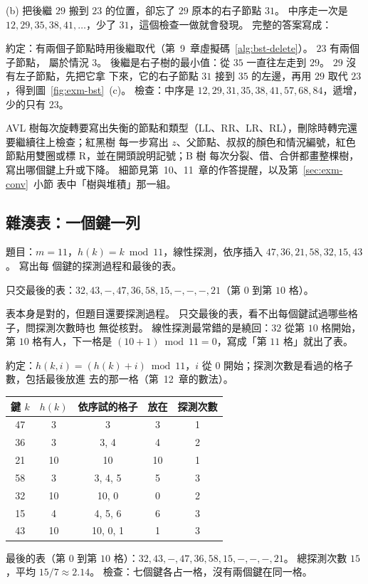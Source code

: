 (b) 把後繼 $29$ 搬到 $23$ 的位置，卻忘了 $29$ 原本的右子節點 $31$。 中序走一次是
$12, 29, 35, 38, 41, \ldots$，少了 $31$，這個檢查一做就會發現。 完整的答案寫成：

\begin{exmgood}
約定：有兩個子節點時用後繼取代（第~9~章虛擬碼~\ref{alg:bst-delete}）。 $23$ 有兩個子節點，
屬於情況 3。 後繼是右子樹的最小值：從 $35$ 一直往左走到 $29$。 $29$ 沒有左子節點，先把它拿
下來，它的右子節點 $31$ 接到 $35$ 的左邊，再用 $29$ 取代 $23$，得到圖~\ref{fig:exm-bst}~(c)。
檢查：中序是 $12, 29, 31, 35, 38, 41, 57, 68, 84$，遞增，少的只有 $23$。
\end{exmgood}

AVL 樹每次旋轉要寫出失衡的節點和類型（LL、RR、LR、RL），刪除時轉完還要繼續往上檢查；紅黑樹
每一步寫出 $z$、父節點、叔叔的顏色和情況編號，紅色節點用雙圈或標 R，並在開頭說明記號；B 樹
每次分裂、借、合併都畫整棵樹，寫出哪個鍵上升或下降。 細節見第~10、11~章的作答提醒，以及第~\ref{sec:exm-conv}~小節
表中「樹與堆積」那一組。

\subsection{雜湊表：一個鍵一列}

題目：$m = 11$，$h(k) = k \bmod 11$，線性探測，依序插入 $47, 36, 21, 58, 32, 15, 43$。 寫出每
個鍵的探測過程和最後的表。

\begin{exmbad}
只交最後的表：$32, 43, -, 47, 36, 58, 15, -, -, -, 21$（第 $0$ 到第 $10$ 格）。
\end{exmbad}

表本身是對的，但題目還要探測過程。 只交最後的表，看不出每個鍵試過哪些格子，問探測次數時也
無從核對。 線性探測最常錯的是繞回：$32$ 從第 $10$ 格開始，第 $10$ 格有人，下一格是
$(10 + 1) \bmod 11 = 0$，寫成「第 $11$ 格」就出了表。

\begin{exmgood}
約定：$h(k, i) = (h(k) + i) \bmod 11$，$i$ 從 $0$ 開始；探測次數是看過的格子數，包括最後放進
去的那一格（第~12~章的數法）。
\begin{center}
\small
\begin{tabular}{ccccc}
\toprule
鍵 $k$ & $h(k)$ & 依序試的格子 & 放在 & 探測次數 \\
\midrule
47 & 3 & 3 & 3 & 1 \\
36 & 3 & 3, 4 & 4 & 2 \\
21 & 10 & 10 & 10 & 1 \\
58 & 3 & 3, 4, 5 & 5 & 3 \\
32 & 10 & 10, 0 & 0 & 2 \\
15 & 4 & 4, 5, 6 & 6 & 3 \\
43 & 10 & 10, 0, 1 & 1 & 3 \\
\bottomrule
\end{tabular}
\end{center}
最後的表（第 $0$ 到第 $10$ 格）：$32, 43, -, 47, 36, 58, 15, -, -, -, 21$。 總探測次數 $15$，平均
$15/7 \approx 2.14$。 檢查：七個鍵各占一格，沒有兩個鍵在同一格。
\end{exmgood}

